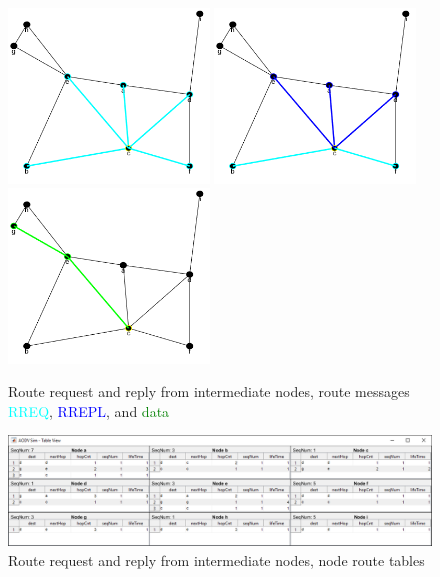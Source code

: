 \documentclass[conference]{IEEEtran}
\begin{document}
\begin{figure}[ht]
	\centering
	\includegraphics[width=2.1in]{Ex_2_request.png}
	\includegraphics[width=2.1in]{Ex_2_reply.png}
	\includegraphics[width=2.1in]{Ex_2_data.png}
	\caption{Route request and reply from intermediate nodes, route messages \\
			\textcolor{cyan}{RREQ}, \textcolor{blue}{RREPL}, and \textcolor{green}{data} }
	\label{fig:ex_2}
\end{figure}

\begin{figure}[ht]
	\centering
	\includegraphics[width=6.8in]{Ex_2_table.png}
	\caption{Route request and reply from intermediate nodes, node route tables}
	\label{fig:ex_2_table}
\end{figure}
\end{document}
